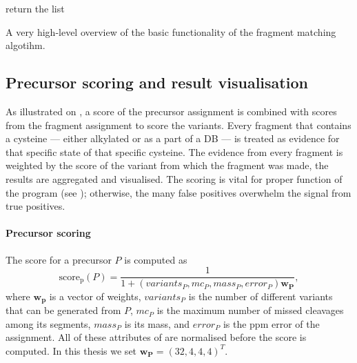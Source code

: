 \begin{algorithm}
\begin{algorithmic}

		\Else
		\label{alg:fragment:elongate}
		\EndIf
		\State return the list 
		\EndFunction
	\end{algorithmic}
	\caption{A very high-level overview of the basic functionality of the fragment matching algotihm.}\label{alg:fragment}
\end{algorithm}

\subsection{Precursor scoring and result visualisation}

As illustrated on , a score of the precursor assignment is combined with scores from the fragment assignment to score the variants. Every fragment that contains a cysteine --- either alkylated or as a part of a DB --- is treated as evidence for that specific state of that specific cysteine. The evidence from every fragment is weighted by the score of the variant from which the fragment was made, the results are aggregated and visualised. The scoring is vital for proper function of the program (see ); otherwise, the many false positives overwhelm the signal from true positives.


\paragraph{Precursor scoring} The score for a precursor \(P\) is computed as \[\operatorname{score_p}(P) = \frac{1}{1 + (\mathit{variants}_P, \mathit{mc}_P, \mathit{mass}_P, \mathit{error}_P)\bm{w_P}},\] where \(\bm{w_p}\) is a vector of weights, \(\mathit{variants}_P\) is the number of different variants that can be generated from \(P\), \(\mathit{mc}_P\) is the maximum number of missed cleavages among its segments, \(\mathit{mass}_P\) is its mass, and \(\mathit{error}_P\) is the ppm error of the assignment. All of these attributes of are normalised before the score is computed. In this thesis we set \(\bm{w_P} = (32, 4, 4, 4)^T\).

